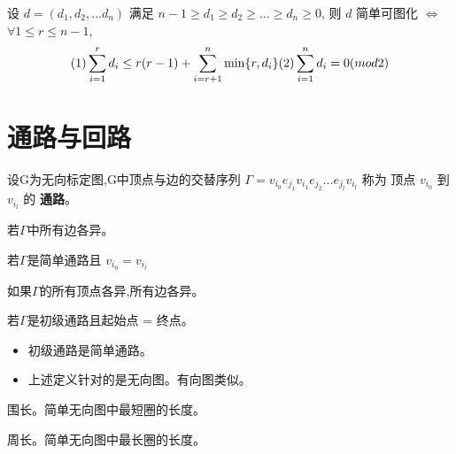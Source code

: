 \documentclass[11pt,fleqn]{book} %
\begin{document}
\begin{CJK}{UTF8}{gkai}
\begin{theorem}
     设 $d = (d_1, d_2 ,... d_n)$ 满足 $n-1 \geq d_1 \geq 
    d_2 \geq ... \geq d_n \geq 0$, 则 $d$ 简单可图化 $\iff$ $\forall 1 \leq r \leq n - 1$, 
    \[
        (1)\sum_{i = 1}^r d_i \leq r(r -1) + \sum_{i = r + 1}^{n} \min\{r, d_i\} \newline (2) \sum_{i = 1}^{n} d_i = 0 (mod 2)
        \]
\end{theorem}
\section{通路与回路}

\begin{definition}[通路]
    设G为无向标定图,G中顶点与边的交替序列 $\Gamma = v_{i_0}e_{j_1}v_{i_1}e_{j_2}...e_{j_l}v_{i_l}$ 称为
    顶点 $v_{i_0}$ 到 $v_{i_l}$ 的 \textbf{通路}。
\end{definition}

\begin{definition}
    若$\Gamma$中所有边各异。
\end{definition}
\begin{definition}
    若$\Gamma$是简单通路且 $v_{i_0} = v_{i_l}$
\end{definition}

\begin{definition}
    如果$\Gamma$的所有顶点各异,所有边各异。
\end{definition}

\begin{definition}
  [初级回路，圈] 
  若$\Gamma$是初级通路且起始点 = 终点。   
\end{definition}

\begin{remark}
    \begin{itemize}
        \item 初级通路是简单通路。
        \item 上述定义针对的是无向图。有向图类似。
    \end{itemize}
    
\end{remark}
\begin{definition}
    [Girth] 围长。简单无向图中最短圈的长度。
\end{definition}
\begin{definition}
    [Perimeter] 周长。简单无向图中最长圈的长度。
\end{definition}


\end{CJK}
\end{document}
